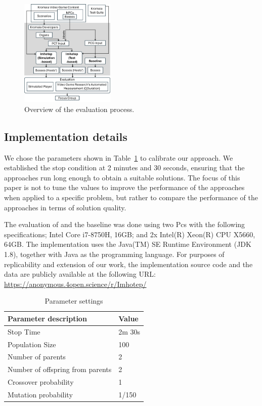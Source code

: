 \begin{figure}[h]
    \centering
    \includegraphics[width=0.4\textwidth]{Figures/evaluation_process.png}
    \caption{Overview of the evaluation process.}
    \label{fig:evaluation}
\end{figure}

\subsection{Implementation details}

We chose the parameters shown in Table~\ref{tab:evaluation_parameters} to calibrate our \ApproachName{} approach. We established the stop condition at 2 minutes and 30 seconds, ensuring that the approaches run long enough to obtain a suitable solutions. The focus of this paper is not to tune the values to improve the performance of the approaches when applied to a specific problem, but rather to compare the performance of the approaches in terms of solution quality.

The evaluation of \ApproachName{} and the baseline was done
using two Pcs with the following specifications; Intel Core i7-8750H, 16GB; and  2x Intel(R) Xeon(R) CPU X5660, 64GB.
The implementation uses the Java(TM) SE Runtime Environment (JDK 1.8), together with Java as the programming language. 
For purposes of replicability and extension of our work, the implementation source code and the data are publicly available at the following URL: \url{https://anonymous.4open.science/r/Imhotep/}

\begin{table}[h]
    \centering
    \begin{tabular}{ll}
        \hline
        \bf{Parameter description}            & \bf{Value}  \\ \hline
        Stop Time                        & 2m 30s \\
        Population Size                  & 100    \\
        Number of parents                & 2      \\
        Number of offspring from parents & 2      \\
        Crossover probability            & 1      \\
        Mutation probability             & 1/150 \\ \hline
    \end{tabular}
    \caption{Parameter settings}
    \label{tab:evaluation_parameters}
    \end{table}

